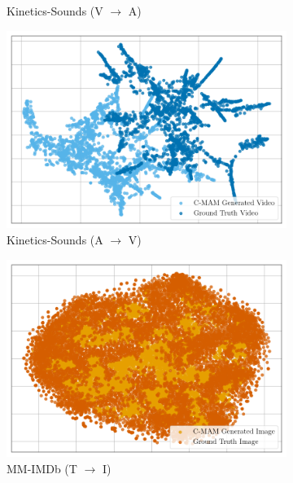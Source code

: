 \begin{figure}[!p]
\begin{subfigure}[b]{0.24\textwidth}
        \caption*{Kinetics-Sounds (V $\rightarrow$ A)}
    \end{subfigure}
    \begin{subfigure}[b]{0.24\textwidth}
        \centering
        \includegraphics[width=\textwidth]{imgs/tsne/ks_video_cmam_1.png}
        \caption*{Kinetics-Sounds (A $\rightarrow$ V)}
    \end{subfigure}
    \begin{subfigure}[b]{0.24\textwidth}
        \centering
        \includegraphics[width=\textwidth]{imgs/tsne/mmimdb_image_cmam_1.png}
        \caption*{MM-IMDb (T $\rightarrow$ I)}
    \end{subfigure}
    \begin{subfigure}[b]{0.24\textwidth}
        \centering

\end{subfigure}
\end{figure}
